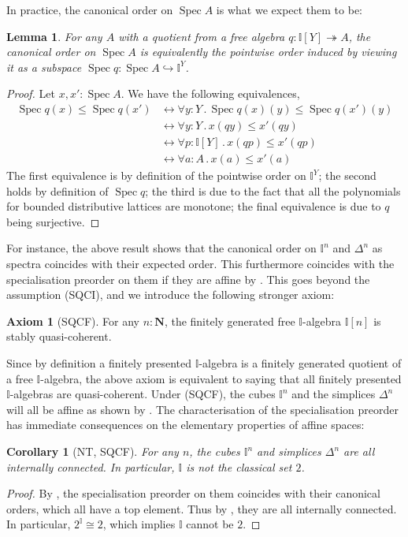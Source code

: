 \documentclass[a4paper,12pt]{amsart}
\newtheorem{lemma}[theorem]{Lemma}
\newtheorem{corollary}[theorem]{Corollary}
\theoremstyle{definition}
\newtheorem*{axiom}{Axiom}
\newcommand{\mb}[1]{\mathbf{#1}}
\newcommand{\mbb}[1]{\mathbb{#1}}
\newcommand{\I}{\mbb I}
\newcommand{\surj}{\twoheadrightarrow}
\newcommand{\hook}{\hookrightarrow}
\newcommand{\N}{\mb N}
\newcommand{\fa}[2]{\forall #1\!\colon\!\!#2\mathpunct{.}}
\newcommand{\eq}{\leftrightarrow}
\newcommand{\spec}{\operatorname{Spec}}
\begin{document}
In practice, the canonical order on $\spec A$ is what we expect them to be:

\begin{lemma}\label{lem:cancoincide}
  For any $A$ with a quotient from a free algebra $q : \I[Y] \surj A$, the canonical order on $\spec A$ is equivalently the pointwise order induced by viewing it as a subspace $\spec q \colon \spec A \hook \I^Y$.
\end{lemma}
\begin{proof}
  Let $x,x' : \spec A$. We have the following equivalences,
  \begin{align*}
    \spec q(x) \le \spec q(x') 
    &\eq \fa yY \spec q(x)(y) \le \spec q(x')(y) \\
    &\eq \fa yY x(qy) \le x'(qy) \\
    &\eq \fa p{\I[Y]} x(qp) \le x'(qp) \\
    &\eq \fa aA x(a) \le x'(a)
  \end{align*}
  The first equivalence is by definition of the pointwise order on $\I^Y$; the second holds by definition of $\spec q$; the third is due to the fact that all the polynomials for bounded distributive lattices are monotone; the final equivalence is due to $q$ being surjective.
\end{proof}




For instance, the above result shows that the canonical order on $\I^n$ and $\Delta^n$ as spectra coincides with their expected order. This furthermore coincides with the specialisation preorder on them if they are affine by . This goes beyond the assumption (SQCI), and we introduce the following stronger axiom:

\begin{axiom}[SQCF]
  For any $n : \N$, the finitely generated free $\I$-algebra $\I[n]$ is stably quasi-coherent. 
\end{axiom}

Since by definition a finitely presented $\I$-algebra is a finitely generated quotient of a free $\I$-algebra, the above axiom is equivalent to saying that all finitely presented $\I$-algebras are quasi-coherent. 
Under (SQCF), the cubes $\I^n$ and the simplices $\Delta^n$ will all be affine as shown by . The characterisation of the specialisation preorder has immediate consequences on the elementary properties of affine spaces:

\begin{corollary}[NT, SQCF]\label{cor:intisnot2}
  For any $n$, the cubes $\I^n$ and simplices $\Delta^n$ are all internally connected. In particular, $\I$ is not the classical set $2$.
\end{corollary}
\begin{proof}
  By , the specialisation preorder on them coincides with their canonical orders, which all have a top element. Thus by , they are all internally connected. In particular, $2^\I \cong 2$, which implies $\I$ cannot be $2$.
\end{proof}
\end{document}
